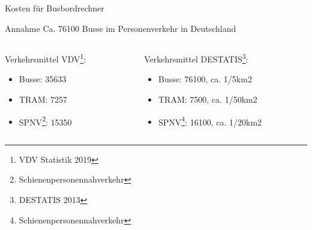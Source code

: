 
\begin{frame}{Kosten für Busbordrechner}

  \begin{block}{Annahme}
    Ca. 76100 Busse im Personenverkehr in Deutschland
  \end{block}

  \begin{columns}

    \begin{column}{0.5\textwidth}
      \minipage[c][0.65\textheight][s]{\columnwidth}
      Verkehrsmittel VDV\footnote{VDV Statistik 2019}:
      \begin{itemize}
      \item Busse: 35633
      \item TRAM: 7257
      \item SPNV\footnote{Schienenpersonennahverkehr}: 15350
      \end{itemize}
      \endminipage
    
    \end{column}

    \begin{column}{0.5\textwidth}
      \minipage[c][0.65\textheight][s]{\columnwidth}
    Verkehrsmittel DESTATIS\footnote{DESTATIS 2013}:
    \begin{itemize}
    \item Busse: 76100, ca. 1/5km2
    \item TRAM: 7500, ca. 1/50km2
    \item SPNV\footnote{Schienenpersonennahverkehr}: 16100, ca. 1/20km2
    \end{itemize}
    \endminipage
    \end{column}

  \end{columns}

\end{frame}

